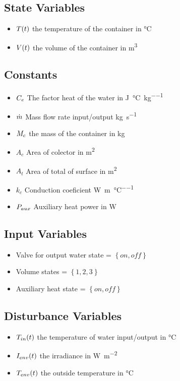 \subsection{State Variables}

\begin{itemize}
\item
$T(t)$ the temperature of the container in \si{\degreeCelsius}
\item
$V(t)$ the volume of the container in \si{\metre^3}

\end{itemize}

\subsection{Constants}
\begin{itemize}
\item 
$C_e$ The factor heat of the water in \si{\joule\per\degreeCelsius\per\kilogram}
\item
$\dot{m}$ Mass flow rate input/output  \si{\kilogram\per\second}
\item
$M_{c}$ the mass of the container in \si{\kilogram}
\item
$A_c$ Area of colector in \si{\metre^2}
\item
$A_t$ Area of total of surface in \si{\metre^2}
\item
$k_c$ Conduction coeficient \si{\watt\per\metre\per\degreeCelsius}
\item
$P_{aux}$ Auxiliary heat power in \si{\watt}

\end{itemize}

\subsection{Input Variables}
\begin{itemize}
\item
Valve for output water state = $\left\lbrace on,off \right\rbrace $
\item
Volume states = $\left\lbrace1,2,3\right\rbrace $
\item
Auxiliary heat state = $\left\lbrace on,off \right\rbrace $


\end{itemize}

\subsection{Disturbance Variables}
\begin{itemize}
\item 
$T_{in}(t)$ the temperature of water input/output in \si{\degreeCelsius}
\item
$I_{env}(t)$ the irradiance in \si{\watt\per\square\metre}
\item
$T_{env}(t)$ the outside temperature in \si{\degreeCelsius}
\end{itemize}

